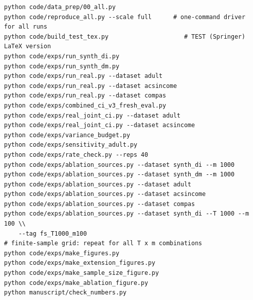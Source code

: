 \documentclass[11pt]{article}
\begin{document}
\begin{verbatim}
python code/data_prep/00_all.py
python code/reproduce_all.py --scale full      # one-command driver for all runs
python code/build_test_tex.py                     # TEST (Springer) LaTeX version
python code/exps/run_synth_di.py
python code/exps/run_synth_dm.py
python code/exps/run_real.py --dataset adult
python code/exps/run_real.py --dataset acsincome
python code/exps/run_real.py --dataset compas
python code/exps/combined_ci_v3_fresh_eval.py
python code/exps/real_joint_ci.py --dataset adult
python code/exps/real_joint_ci.py --dataset acsincome
python code/exps/variance_budget.py
python code/exps/sensitivity_adult.py
python code/exps/rate_check.py --reps 40
python code/exps/ablation_sources.py --dataset synth_di --m 1000
python code/exps/ablation_sources.py --dataset synth_dm --m 1000
python code/exps/ablation_sources.py --dataset adult
python code/exps/ablation_sources.py --dataset acsincome
python code/exps/ablation_sources.py --dataset compas
python code/exps/ablation_sources.py --dataset synth_di --T 1000 --m 100 \\
    --tag fs_T1000_m100
# finite-sample grid: repeat for all T x m combinations
python code/exps/make_figures.py
python code/exps/make_extension_figures.py
python code/exps/make_sample_size_figure.py
python code/exps/make_ablation_figure.py
python manuscript/check_numbers.py
\end{verbatim}


\end{document}
